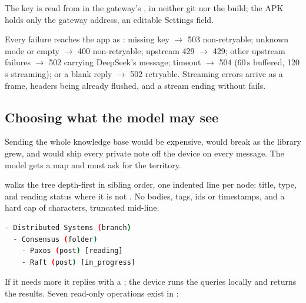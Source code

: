 The key is read from  in the gateway's , in neither git nor the build;
the APK holds only the gateway address, an editable Settings field.

Every failure reaches the app as : missing key $\rightarrow$ 503 non-retryable;
unknown mode or empty  $\rightarrow$ 400 non-retryable; upstream 429 $\rightarrow$ 429; other
upstream failures $\rightarrow$ 502 carrying DeepSeek's message; timeout $\rightarrow$ 504 (60\,s buffered,
120\,s streaming);  or a blank reply $\rightarrow$ 502 retryable. Streaming
errors arrive as a frame, headers being already flushed, and a stream ending without  fails.

\subsection{Choosing what the model may see}

Sending the whole knowledge base would be expensive, would break as the library grew, and would ship every
private note off the device on every message. The model gets a map and must ask for the territory.

 walks the tree depth-first in sibling order, one indented line per node: title, type,
and reading status where it is not . No bodies, tags, ids or timestamps, and a hard cap of
 characters, truncated mid-line.

\begin{lstlisting}[language=bash, caption={The compact KB index --- the only context sent unprompted.}]
- Distributed Systems (branch)
  - Consensus (folder)
    - Paxos (post) [reading]
    - Raft (post) [in_progress]
\end{lstlisting}

If it needs more it replies with a ; the device runs the queries locally and returns
the results. Seven read-only operations exist in :


